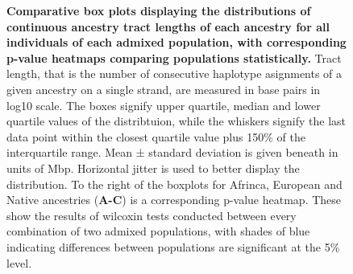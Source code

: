 \documentclass[11pt]{article}
\begin{document}
\begin{figure}[htb!]%
    \centering
     \hspace*{0em}
        \vspace{-0.6cm}
        \caption{\textbf{
            Comparative box plots displaying the distributions of continuous ancestry tract lengths of each ancestry for all individuals of each admixed population, with corresponding p-value heatmaps comparing populations statistically.
        }
            Tract length, that is the number of consecutive haplotype asignments of a given ancestry on a single strand, are measured in base pairs in log10 scale. The boxes signify upper quartile, median and lower quartile values of the distribtuion, while the whiskers signify the last data point within the closest quartile value plus 150\% of the interquartile range. Mean ± standard deviation is given beneath in units of Mbp. Horizontal jitter is used to better display the distribution. To the right of the boxplots for Afrinca, European and Native ancestries (\textbf{A-C}) is a corresponding p-value heatmap. These show the results of wilcoxin tests conducted between every combination of two admixed populations, with shades of blue indicating differences between populations are significant at the 5\% level.
        }
\end{figure}
\end{document}
